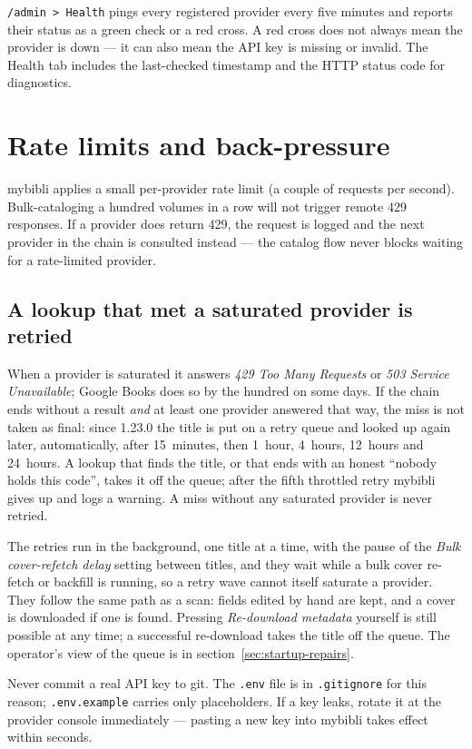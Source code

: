 \texttt{/admin > Health} pings every registered provider every five
minutes and reports their status as a green check or a red cross.
A red cross does not always mean the provider is down — it can also
mean the API key is missing or invalid. The Health tab includes the
last-checked timestamp and the HTTP status code for diagnostics.

\section{Rate limits and back-pressure}

mybibli applies a small per-provider rate limit (a couple of
requests per second). Bulk-cataloging a hundred volumes in a row
will not trigger remote 429 responses. If a provider does return
429, the request is logged and the next provider in the chain is
consulted instead — the catalog flow never blocks waiting for a
rate-limited provider.

\subsection*{A lookup that met a saturated provider is retried}

When a provider is saturated it answers \emph{429 Too Many Requests}
or \emph{503 Service Unavailable}; Google Books does so by the
hundred on some days. If the chain ends without a result \emph{and} at
least one provider answered that way, the miss is not taken as final:
since 1.23.0 the title is put on a retry queue and looked up again
later, automatically, after 15~minutes, then 1~hour, 4~hours,
12~hours and 24~hours. A lookup that finds the title, or that ends
with an honest ``nobody holds this code'', takes it off the queue;
after the fifth throttled retry mybibli gives up and logs a warning.
A miss without any saturated provider is never retried.

The retries run in the background, one title at a time, with the
pause of the \emph{Bulk cover-refetch delay} setting between titles,
and they wait while a bulk cover re-fetch or backfill is running, so
a retry wave cannot itself saturate a provider. They follow the same
path as a scan: fields edited by hand are kept, and a cover is
downloaded if one is found. Pressing \emph{Re-download metadata}
yourself is still possible at any time; a successful re-download takes
the title off the queue. The operator's view of the queue is in
section~\ref{sec:startup-repairs}.

\begin{warning}
Never commit a real API key to git. The \texttt{.env} file is in
\texttt{.gitignore} for this reason; \texttt{.env.example} carries
only placeholders. If a key leaks, rotate it at the provider
console immediately — pasting a new key into mybibli takes effect
within seconds.
\end{warning}


